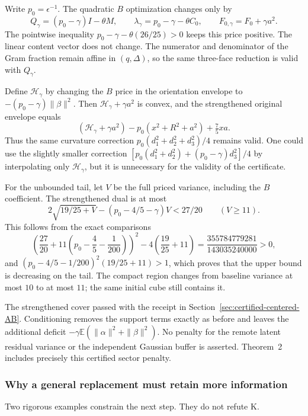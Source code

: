 Write $p_0=\epsilon^{-1}$.  The quadratic $B$ optimization changes only by
\[
 Q_\gamma=(p_0-\gamma)I-\theta M,
 \qquad \lambda_\gamma=p_0-\gamma-\theta C_0,
 \qquad F_{0,\gamma}=F_0+\gamma a^2.
\]
The pointwise inequality
$p_0-\gamma-\theta(26/25)>0$ keeps this price positive.
The linear content vector does not change.  The numerator and denominator
of the Gram fraction remain affine in $(q,\Delta)$, so the same three-face
reduction is valid with $Q_\gamma$.

Define $\mathcal H_\gamma$ by changing the $B$ price in the orientation
envelope to $-(p_0-\gamma)\|\beta\|^2$.
Then $\mathcal H_\gamma+\gamma a^2$ is convex, and the strengthened original
envelope equals
\[
 (\mathcal H_\gamma+\gamma a^2)
       -p_0(x^2+R^2+a^2)+\tfrac75xa.
\]
Thus the same curvature correction
$p_0(d_1^2+d_2^2+d_3^2)/4$ remains valid.  One could use the slightly
smaller correction
$[p_0(d_1^2+d_2^2)+(p_0-\gamma)d_3^2]/4$ by interpolating only
$\mathcal H_\gamma$, but it is unnecessary for the validity of the
certificate.

For the unbounded tail, let $V$ be the full priced variance, including the
$B$ coefficient.  The strengthened dual is at most
\[
 2\sqrt{19/25+V}-(p_0-4/5-\gamma)V<27/20\qquad(V\ge11).
\]
This follows from the exact comparisons
\[
 \left(\frac{27}{20}+11\left(p_0-\frac45-\frac1{200}\right)\right)^2
       -4\left(\frac{19}{25}+11\right)
 =\frac{355784779281}{143035240000}>0,
\]
and $(p_0-4/5-1/200)^2(19/25+11)>1$, which proves that the upper bound is
decreasing on the tail.  The compact region changes from baseline variance
at most $10$ to at most $11$; the same initial cube still contains it.

The strengthened cover passed with the receipt in
Section~\ref{sec:certified-centered-AB}.  Conditioning removes the support
terms exactly as before and leaves the additional deficit
$-\gamma\mathbb E(\|\alpha\|^2+\|\beta\|^2)$.
No penalty for the remote latent residual variance or the independent
Gaussian buffer is asserted.  Theorem~2 includes precisely this certified
sector penalty.

\subsubsection{Why a general replacement must retain more information}

Two rigorous examples constrain the next step.  They do not refute K.


